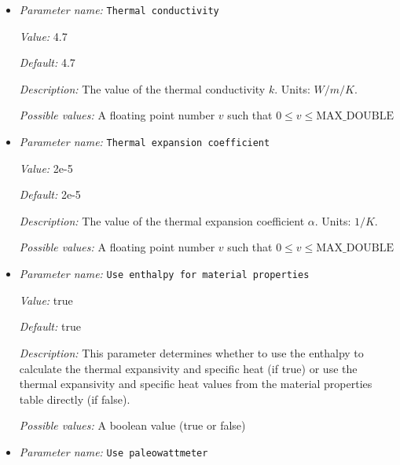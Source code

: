 \begin{itemize}
{\it Description:} The reference temperature $T_0$. Units: $K$.


{\it Possible values:} A floating point number $v$ such that $0 \leq v \leq \text{MAX\_DOUBLE}$
\item {\it Parameter name:} {\tt Thermal conductivity}
\label{parameters:Material model/Grain size model/Thermal conductivity}


{\it Value:} 4.7


{\it Default:} 4.7


{\it Description:} The value of the thermal conductivity $k$. Units: $W/m/K$.


{\it Possible values:} A floating point number $v$ such that $0 \leq v \leq \text{MAX\_DOUBLE}$
\item {\it Parameter name:} {\tt Thermal expansion coefficient}
\label{parameters:Material model/Grain size model/Thermal expansion coefficient}


{\it Value:} 2e-5


{\it Default:} 2e-5


{\it Description:} The value of the thermal expansion coefficient $\alpha$. Units: $1/K$.


{\it Possible values:} A floating point number $v$ such that $0 \leq v \leq \text{MAX\_DOUBLE}$
\item {\it Parameter name:} {\tt Use enthalpy for material properties}
\label{parameters:Material model/Grain size model/Use enthalpy for material properties}


{\it Value:} true


{\it Default:} true


{\it Description:} This parameter determines whether to use the enthalpy to calculate the thermal expansivity and specific heat (if true) or use the thermal expansivity and specific heat values from the material properties table directly (if false).


{\it Possible values:} A boolean value (true or false)
\item {\it Parameter name:} {\tt Use paleowattmeter}
\label{parameters:Material model/Grain size model/Use paleowattmeter}



\end{itemize}
